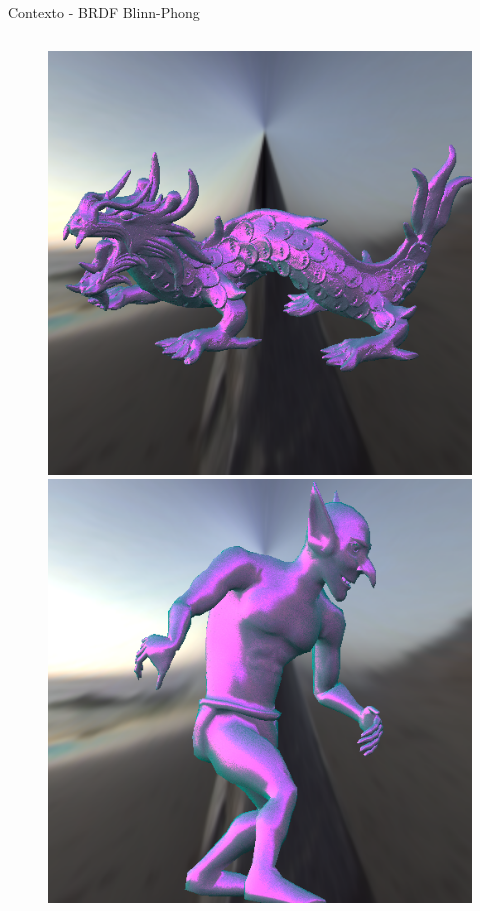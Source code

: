 \begin{frame}{Contexto - BRDF Blinn-Phong}
\begin{columns}
\begin{figure}[H]
            
            \includegraphics[height=0.32\textheight]{./Imagens/brdfs/blinn-phong-dragon.png}
            
            
            \includegraphics[height=0.32\textheight]{./Imagens/brdfs/blinn-phong-goblin.png}
            

\end{figure}
\end{columns}
\end{frame}

